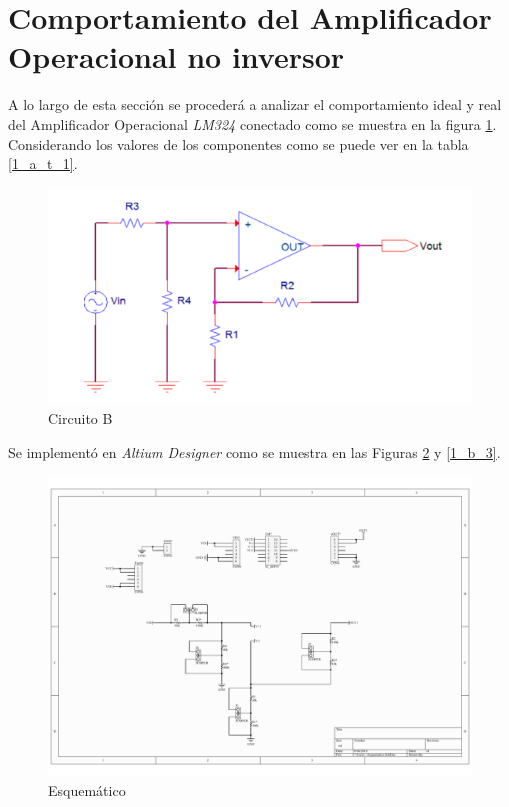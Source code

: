 \section{Comportamiento del Amplificador Operacional no inversor}

A lo largo de esta sección se procederá a analizar el comportamiento
ideal y real del Amplificador Operacional \emph{LM324 }conectado como
se muestra en la figura \ref{1_b_1}. Considerando los valores de
los componentes como se puede ver en la tabla \ref{1_a_t_1}. 

\begin{figure}[H]
\begin{centering}
\includegraphics[scale=0.5]{../Ex1/iB/Resources1b/circuit}
\par\end{centering}
\caption{Circuito B}
\label{1_b_1}

\end{figure}

Se implementó en \emph{Altium Designer }como se muestra en las Figuras
\ref{1_b_2} y \ref{1_b_3}.

\begin{figure}[H]
\begin{centering}
\includegraphics[scale=0.5]{../Ex1/iB/Resources1b/Schematic}
\par\end{centering}
\caption{Esquemático}
\label{1_b_2}

\end{figure}

